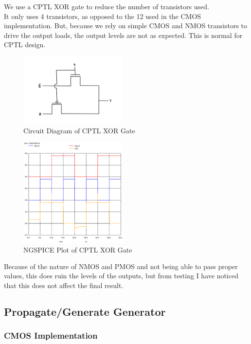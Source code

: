 \documentclass[conference]{IEEEtran}
\begin{document}
We use a CPTL XOR gate to reduce the number of transistors used. \\
It only uses 4 transistors, as opposed to the 12 used in the CMOS implementation. But, because we rely on simple CMOS and NMOS transistors to drive the output loads, the output levels are not as expected. This is normal for CPTL design.

\begin{figure}[H]
    \centering
    \includegraphics[width=0.48\textwidth]{images/xor_optimized_circuit_diagram.png}
    \caption{Circuit Diagram of CPTL XOR Gate}
\end{figure}

\begin{figure}[H]
    \centering
    \includegraphics[width=0.48\textwidth]{images/xor_optimized_tran.eps}
    \caption{NGSPICE Plot of CPTL XOR Gate}
\end{figure}

Because of the nature of NMOS and PMOS and not being able to pass proper values, this does ruin the levels of the outputs, but from testing I have noticed that this does not affect the final result.

\subsection{Propagate/Generate Generator}

\subsubsection{CMOS Implementation}
\end{document}
